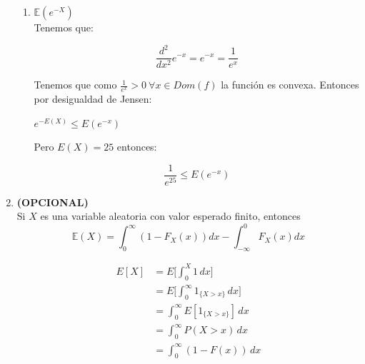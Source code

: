\documentclass[12pt,a4paper]{report}
\begin{document}
\begin{enumerate}
{\begin{enumerate}
				\item {
					$\mathbb{E}(e^{-X})$\\
					Tenemos que:\\
					\begin{center}
					    $$\frac{d^2}{dx^2} e^{-x}=e^{-x}=\frac{1}{e^x}$$
					\end{center}
					Tenemos que como $\frac{1}{e^x}>0 \ \forall x\in Dom(f)$ la función es convexa. Entonces por desigualdad de Jensen:\\
					\begin{center}
					    $e^{-E(X)}\leq E(e^{-x})$
					\end{center}
					Pero $E(X)=25$ entonces:\\
					\begin{center}
					    $$\frac{1}{e^{25}}\leq E(e^{-x})$$
					\end{center}
				}
			\end{enumerate}
		}

		\item{
			\textbf{(OPCIONAL)}\\
			Si $X$ es una variable aleatoria con valor esperado finito,
			entonces
			\[\mathbb{E}(X) = \int_{0}^{\infty}{(1-F_X(x))dx} -
			\int_{-\infty}^{0}{F_X(x)dx}\]


			\begin{align*}
E[X] &= E\bigg[\int_0^X 1\,dx\bigg]\\
&= E\bigg[\int_0^\infty 1_{\{X>x\}}\,dx\bigg]\\
&= \int_0^\infty E[1_{\{X>x\}}]\,dx\\
&= \int_0^\infty P(X > x)\,dx\\
&= \int_0^\infty (1 - F(x))\,dx
\end{align*}

		}

	\end{enumerate}
\end{document}
